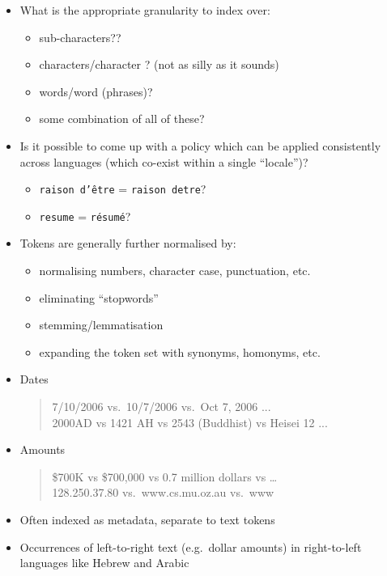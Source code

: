 \documentclass[a4paper,landscape,headrule,footrule,xetex]{foils}
\begin{document}
\begin{itemize}
\item What is the appropriate granularity to index over:
  \begin{itemize}
  \item sub-characters??
  \item characters/character \WMngram[s]? (not as silly as it sounds)
  \item words/word \WMngram[s] (phrases)?
  \item some combination of all of these?
  \end{itemize}
\item Is it possible to come up with a policy which can be applied
  consistently across languages (which co-exist within a single ``locale'')?
  \begin{itemize}
  \item \texttt{raison d'\^etre} = \texttt{raison detre}?
  \item \texttt{resume} = \texttt{r\'esum\'e}?
  \end{itemize}
\end{itemize}





\begin{itemize}
\item Tokens are generally further normalised by:
  \begin{itemize}
  \item normalising numbers, character case, punctuation, etc.
  \item eliminating ``stopwords''
  \item stemming/lemmatisation
  \item expanding the token set with synonyms, homonyms, etc.
  \end{itemize}
\end{itemize}







\begin{itemize}
\item Dates
  \begin{quote}
    7/10/2006 vs.\ 10/7/2006 vs.\ Oct 7, 2006 ...\\
    2000AD vs 1421 AH vs 2543 (Buddhist) vs Heisei 12 ...
  \end{quote}
\item Amounts
  \begin{quote}
    \$700K vs \$700,000 vs 0.7 million dollars vs \ldots \\
    128.250.37.80 vs.\ www.cs.mu.oz.au vs.\ www
  \end{quote}
\item Often indexed as metadata, separate to text tokens
\item Occurrences of left-to-right text (e.g.\ dollar amounts) in
  right-to-left languages like Hebrew and Arabic
\end{itemize}
\end{document}

